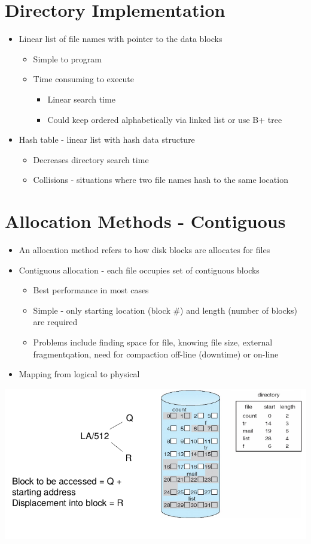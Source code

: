 \documentclass{article}[18pt]
\begin{document}
\section{Directory Implementation}
\begin{itemize}
	\item Linear list of file names with pointer to the data blocks
	\begin{itemize}
		\item Simple to program
		\item Time consuming to execute
		\begin{itemize}
			\item Linear search time
			\item Could keep ordered alphabetically via linked list or use B+ tree
		\end{itemize}
	\end{itemize}
	\item Hash table - linear list with hash data structure
	\begin{itemize}
		\item Decreases directory search time
		\item Collisions - situations where two file names hash to the same location
	\end{itemize}
\end{itemize}
\section{Allocation Methods - Contiguous}
\begin{itemize}
	\item An allocation method refers to how disk blocks are allocates for files
	\item Contiguous allocation - each file occupies set of contiguous blocks
	\begin{itemize}
		\item Best performance in most cases
		\item Simple - only starting location (block \#) and length (number of blocks) are required
		\item Problems include finding space for file, knowing file size, external fragmentqation, need for compaction off-line (downtime) or on-line
	\end{itemize}
	\item Mapping from logical to physical
\end{itemize}
\begin{center}
	\includegraphics[scale=0.7]{Allocation}
\end{center}
\end{document}
